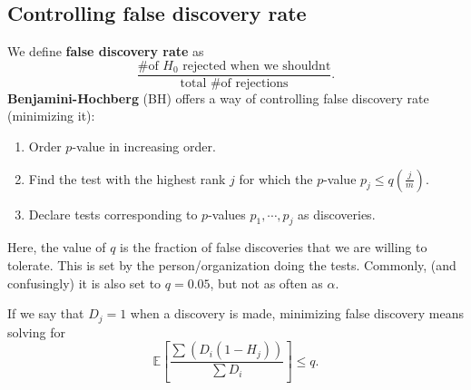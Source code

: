 \documentclass[titlepage, 12pt, leqno]{article}
\begin{document}
\subsection{Controlling false discovery rate}
We define \textbf{false discovery rate} as
\[
    \frac{ \text{\# of $H_{0}$ rejected when we shouldnt}}{
    \text{total \# of rejections}}.
\]
\textbf{Benjamini-Hochberg} (BH) offers a way of controlling false discovery rate
(minimizing it):
\begin{enumerate}
    \item Order $p$-value in increasing order.
    \item Find the test with the highest rank $j$ for which the $p$-value
        $p_{j} \le q\left(\frac{j}{m}\right)$.
    \item Declare tests corresponding to $p$-values $p_{1}, \cdots , p_{j}$ as
        discoveries.
\end{enumerate}
Here, the value of $q$ is the fraction of false discoveries that we are willing
to tolerate. This is set by the person/organization doing the tests. Commonly,
(and confusingly) it is also set to $q=0.05$, but not as often as $\alpha$.

If we say that $D_{j}=1$ when a discovery is made, minimizing false discovery
means solving for
\[
    \mathbb{E}\left[\frac{\sum (D_{i}(1-H_{j}))}{\sum D_{i}}\right] \le q.
\]
\end{document}
